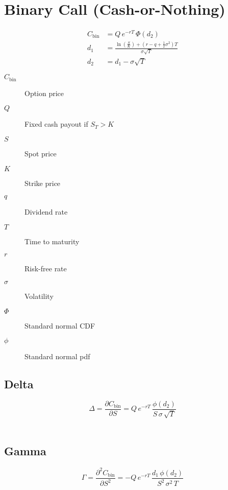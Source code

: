 \documentclass[12pt,a4paper]{article}
\begin{document}
\[
  \begin{aligned}
  \end{aligned}
\]

\newpage

\section{Binary Call (Cash-or-Nothing)}

\[
  \begin{aligned}
    C_{\mathrm{bin}} & = Q \, e^{-rT} \,\Phi(d_2) \\
    d_1 & = \frac{\ln\!\left(\tfrac{S}{K}\right) + (r - q + \tfrac{1}{2}\sigma^2)T}{\sigma \sqrt{T}} \\
    d_2 & = d_1 - \sigma \sqrt{T}
  \end{aligned}
\]

\begin{description}
  \item[$C_{\mathrm{bin}}$] Option price
  \item[$Q$] Fixed cash payout if \( S_T > K \)
  \item[$S$] Spot price
  \item[$K$] Strike price
  \item[$q$] Dividend rate
  \item[$T$] Time to maturity
  \item[$r$] Risk-free rate
  \item[$\sigma$] Volatility
  \item[$\Phi$] Standard normal CDF
  \item[$\phi$] Standard normal pdf
\end{description}

\subsection{Delta}
\[
  \boxed{\Delta = \frac{\partial C_{\mathrm{bin}}}{\partial S} 
  = Q\, e^{-rT}\, \frac{\phi(d_2)}{S\,\sigma\,\sqrt{T}}}
\]

\[
  \begin{aligned}
  \end{aligned}
\]

\subsection{Gamma}
\[
  \boxed{\Gamma = \frac{\partial^2 C_{\mathrm{bin}}}{\partial S^2} 
  = -Q\, e^{-rT}\, \frac{d_1\,\phi(d_2)}{S^2\,\sigma^2\,T}}
\]
\end{document}
